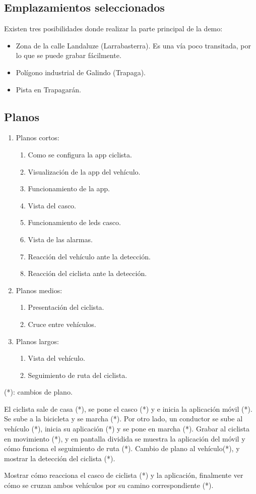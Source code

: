 \subsection{Emplazamientos seleccionados}
Existen tres posibilidades donde realizar la parte principal de la demo:
\begin{itemize}
	\item Zona de la calle Landaluze (Larrabasterra). Es una vía poco transitada, por lo que se puede grabar fácilmente.
	
	\item Polígono industrial de Galindo (Trapaga).
	
	\item Pista en Trapagarán.
\end{itemize}

\subsection{Planos}
\begin{enumerate}
	\item Planos cortos:
	\begin{enumerate}
		\item Como se configura la app ciclista.
		\item Visualización de la app del vehículo.
		\item Funcionamiento de la app.
		\item Vista del casco.
		\item Funcionamiento de leds casco.
		\item Vista de las alarmas.
		\item Reacción del vehículo ante la detección.
		\item Reacción del ciclista ante la detección.
	\end{enumerate}
	
	\item Planos medios:
	\begin{enumerate}
		\item Presentación del ciclista.
		\item Cruce entre vehículos.
	\end{enumerate}
	
	\item Planos largos:
	\begin{enumerate}
		\item Vista del vehículo.
		\item Seguimiento de ruta del ciclista.
	\end{enumerate}
\end{enumerate}
(*): cambios de plano.

El ciclista sale de casa (*), se pone el casco (*) y e inicia la aplicación móvil (*). Se sube a la bicicleta y se marcha (*). Por otro lado, un conductor se sube al vehículo (*), inicia su aplicación (*) y se pone en marcha (*). Grabar al ciclista en movimiento (*), y en pantalla dividida se muestra la aplicación del móvil y cómo funciona el seguimiento de ruta (*). Cambio de plano al vehículo(*), y mostrar la detección del ciclista (*).

Mostrar cómo reacciona el casco de ciclista (*) y la aplicación, finalmente ver cómo se cruzan ambos vehículos por su camino correspondiente (*).